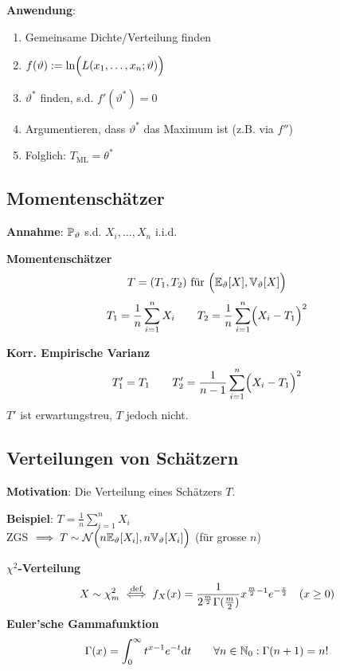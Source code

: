 {\footnotesize
    \textbf{Anwendung}: 
    \begin{enumerate}
        \item Gemeinsame Dichte/Verteilung finden
        \item $f(\vartheta) := \ln\Bigl( L(x_1,\ldots,x_n;\vartheta) \Bigr)$
        \item $\vartheta^*$ finden, s.d. $f'(\vartheta^*) = 0$
        \item Argumentieren, dass $\vartheta^*$ das Maximum ist (z.B. via $f''$)
        \item Folglich: $T_\text{ML} = \theta^*$
    \end{enumerate}
}

\subsection{Momentenschätzer}

\textbf{Annahme}: $\P_\vartheta$ s.d. $X_i,\ldots,X_n$ i.i.d.

 \textbf{Momentenschätzer}
$$
    T = (T_1, T_2) \text{ für } \Bigl(\E_\vartheta[X], \V_\vartheta[X] \Bigr)
$$
$$
    T_1 = \frac{1}{n}\sum_{i=1}^n X_i \qquad T_2 = \frac{1}{n}\sum_{i=1}^n \Bigl( X_i - T_1 \Bigr)^2
$$

 \textbf{Korr. Empirische Varianz} 
$$
    T_1' = T_1 \qquad T_2' = \frac{1}{n-1}\sum_{i=1}^n \Bigl( X_i - T_1 \Bigr)^2
$$
{\footnotesize
    \remark $T'$ ist erwartungstreu, $T$ jedoch nicht.
}

\subsection{Verteilungen von Schätzern}

\textbf{Motivation}: Die Verteilung eines Schätzers $T$.\\

{\scriptsize
    \textbf{Beispiel}: $T = \frac{1}{n}\sum_{i=1}^n X_i$\\
    ZGS $\implies T \sim \mathcal{N}\Bigl(n\E_\vartheta[X_i],n\V_\vartheta[X_i]\Bigr)$ (für grosse $n$)
}

 $\chi^2$\textbf{-Verteilung}\\
$$
    X \sim \chi^2_m \iffdef f_X(x) = \frac{1}{2^{\frac{m}{2}}\Gamma(\frac{m}{2})}x^{\frac{m}{2}-1}e^{-\frac{x}{2}} \quad (x \geq 0)
$$
 \textbf{Euler'sche Gammafunktion}
$$
    \Gamma(x) = \int_0^\infty t^{x-1}e^{-t}\text{d}t \qquad \forall n \in \N_0: \Gamma(n+1) = n!
$$


